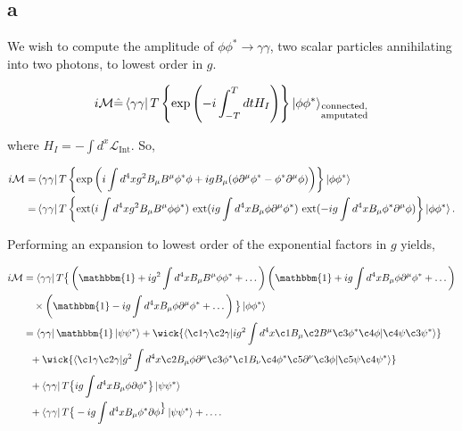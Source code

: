 \documentclass[11pt, a4paper]{amsart}
\begin{document}
\subsection{a}

We wish to compute the amplitude of $\phi\phi^* \rightarrow \gamma\gamma$, two scalar particles annihilating into two photons, to lowest order in $g$.

\begin{equation}
i\mathcal{M} \hat{=} \bra{\gamma\gamma}T\left\{\text{exp}\left(-i\int_{-T}^T dt H_I \right) \right\} \ket{\phi\phi^*}_{\substack{\text{connected,}\\ \text{amputated}}} 
\end{equation}

where $H_I = -\int d^x \mathcal{L}_{\text{Int}}$. So,

\begin{align*}
i \mathcal{M} = &\bra{\gamma\gamma} T \left\{\text{exp} \left( i \int d^4x g^2 B_\mu B^\mu \phi^* \phi + ig B_\mu (\phi \partial^\mu \phi^* - \phi^*\partial^\mu \phi) \right) \right\} \ket{\phi\phi^*} \\
	= &\bra{\gamma\gamma}T \left\{\text{ext}(i\int d^4xg^2B_\mu B^\mu \phi\phi^*)\ \text{ext} (ig \int d^4xB_\mu \phi \partial^\mu \phi^*)\ \text{ext} (-ig \int d^4xB_\mu \phi^* \partial^\mu \phi) \right\}\ket{\phi\phi^*}.
\end{align*}

Performing an expansion to lowest order of the exponential factors in $g$ yields,

\begin{align*}
i\mathcal{M} &= \bra{\gamma\gamma} T \big\{
		\left(\mathbbm{1} + ig^2 \int d^4x B_\mu B^\mu\phi\phi^* + \dots \right)
		\left(\mathbbm{1} + ig  \int d^4x B_\mu \phi \partial^\mu \phi^* + \dots \right) \\
		& \quad \times		
		\left(\mathbbm{1} - ig   \int d^4x B_\mu \phi \partial^\mu \phi^* + \dots  \right)		
		\big\}
		\ket{\phi\phi^*} \\
		&= \bra{\gamma\gamma} \mathbbm{1} \ket{\psi\psi^*} 
		+ \wick{\langle \c1 \gamma \c2 \gamma | ig^2 \int d^4x \c1 B_\mu \c2 B^\mu \c3 \phi^* \c4 \phi | \c4 \psi \c3 \psi^* \rangle } \\
		&\ \ + \wick{\langle\c1\gamma\c2\gamma|g^2 \int d^4x \c2 B_\mu \phi\partial^\mu \c3 \phi^* \c1 B_\nu \c4 \phi^* \c5 \partial^\nu \c3 \phi |\c5 \psi \c4 \psi^*\rangle} \\
		&\ \ + \bra{\gamma\gamma}T\big\{ ig \int d^4x B_\mu \phi \partial \phi^* \big\} \ket{\psi\psi^*} \\
		&\ \ + \bra{\gamma\gamma}T\big\{ -ig \int d^4x B_\mu \phi^* \partial \phi^ \big\} \ket{\psi\psi^*}  + \dots.
\end{align*} 
\end{document}
